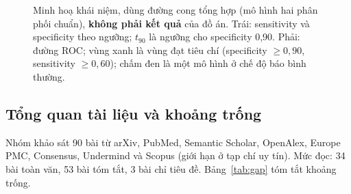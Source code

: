 \begin{figure}[H]
\caption{Minh hoạ khái niệm, dùng đường cong tổng hợp (mô hình hai phân phối chuẩn), \textbf{không phải kết quả}
của đồ án. Trái: sensitivity và specificity theo ngưỡng; $t_{90}$ là ngưỡng cho specificity 0,90. Phải: đường
ROC; vùng xanh là vùng đạt tiêu chí (specificity $\ge 0{,}90$, sensitivity $\ge 0{,}60$); chấm đen là một mô
hình ở chế độ báo bình thường.}
\label{fig:oppoint}
\end{figure}

\subsection{Tổng quan tài liệu và khoảng trống}

Nhóm khảo sát 90 bài từ arXiv, PubMed, Semantic Scholar, OpenAlex, Europe PMC, Consensus, Undermind và Scopus
(giới hạn ở tạp chí uy tín). Mức đọc: 34 bài toàn văn, 53 bài tóm tắt, 3 bài chỉ tiêu đề.
Bảng~\ref{tab:gap} tóm tắt khoảng trống.

